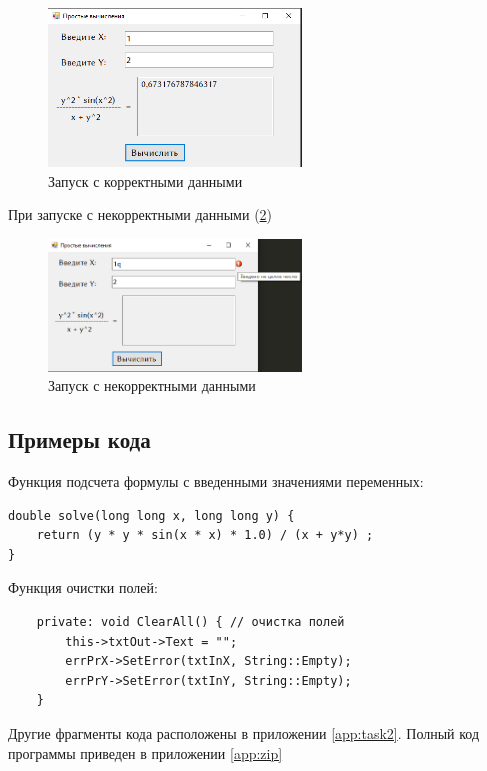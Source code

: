 \begin{figure}[!h]
    \centering
    \includegraphics[width = 0.6\textwidth]{images/Task2/Works1.png}
    \caption{Запуск с корректными данными}
    \label{fig:WorkForm2}
\end{figure}

При запуске с некорректными данными (\ref{fig:BadInputNotIntForm2})

\begin{figure}[!h]
    \centering
    \includegraphics[width = 0.6\textwidth]{images/Task2/BadInputNotInt1.png}
    \caption{Запуск с некорректными данными}
    \label{fig:BadInputNotIntForm2}
\end{figure}

\subsection{Примеры кода}

Функция подсчета формулы с введенными значениями переменных:

\begin{verbatim}
double solve(long long x, long long y) {
	return (y * y * sin(x * x) * 1.0) / (x + y*y) ;
}
\end{verbatim}

Функция очистки полей:

\begin{verbatim}
	private: void ClearAll() { // очистка полей
		this->txtOut->Text = "";
		errPrX->SetError(txtInX, String::Empty);
		errPrY->SetError(txtInY, String::Empty);
	}
\end{verbatim}

Другие фрагменты кода расположены в приложении \ref{app:task2}. Полный код программы приведен в приложении \ref{app:zip}
